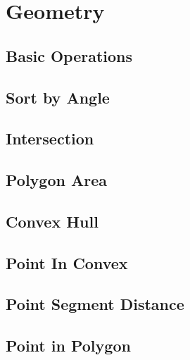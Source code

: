 \documentclass[a4paper,10pt,twocolumn,oneside,x11names]{article}
\begin{document}
% 

\section{Geometry}

\subsection{Basic Operations}


\subsection{Sort by Angle}


\subsection{Intersection}


\subsection{Polygon Area}


\subsection{Convex Hull}


\subsection{Point In Convex}


\subsection{Point Segment Distance}


\subsection{Point in Polygon}

\end{document}
